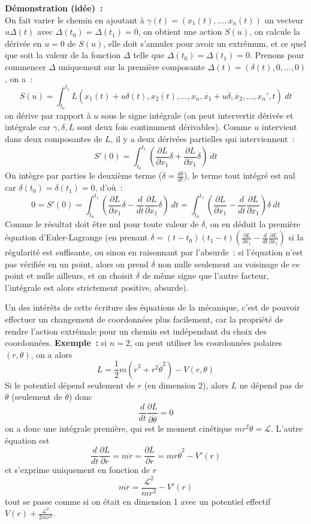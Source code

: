 \documentclass[a4paper,11pt]{article}
\begin{document}
\begin{giacjshere}
{\bf D\'emonstration (id\'ee)~:}\\
On fait varier le chemin en ajoutant \`a 
$\gamma(t)=(x_1(t),...,x_n(t))$
un vecteur $u \Delta(t)$ avec $\Delta(t_0)=\Delta(t_1)=0$, on obtient
une action $S(u)$, on calcule la d\'eriv\'ee en $u=0$
de $S(u)$, elle doit s'annuler pour avoir un extr\^emum, et
ce quel que soit la valeur de la fonction $\Delta$ 
telle que $\Delta(t_0)=\Delta(t_1)=0$. Prenons pour commencer $\Delta$
uniquement sur la premi\`ere composante
$\Delta(t)=(\delta(t),0,...,0)$, on a~:
$$ S(u) = \int_{t_0}^{t_1}
L(x_1(t)+u\delta(t),x_2(t),...,x_n,\dot{x_1}+u\dot{\delta},\dot{x_2},...,x_n',t)  \ dt$$
on d\'erive par rapport \`a $u$ sous le signe int\'egrale (on peut
intervertir d\'eriv\'ee et int\'egrale car $\gamma, \delta, L$ sont
deux fois continument d\'erivables). Comme $u$ intervient dans deux
composantes de $L$, il y a deux d\'eriv\'ees partielles qui
interviennent~:
$$ S'(0) =\int_{t_0}^{t_1} \left(\frac{\partial L}{\partial x_1} \delta + 
\frac{\partial L}{\partial \dot{x_1}} \dot{\delta} \right) \ dt$$
On int\`egre par parties le deuxi\`eme terme ($\dot{\delta}=\frac{d
  \delta}{dt}$), le terme tout int\'egr\'e est nul 
car $\delta(t_0)=\delta(t_1)=0$, d'o\`u~:
$$ 0=S'(0)=\int_{t_0}^{t_1} \left( \frac{\partial L}{\partial x_1} \delta 
-\frac{d}{dt} \frac{\partial L}{\partial \dot{x_1}} \delta \right) \ 
dt
=\int_{t_0}^{t_1} \left( \frac{\partial L}{\partial x_1} 
-\frac{d}{dt} \frac{\partial L}{\partial \dot{x_1}} \right) \delta \ 
dt$$
Comme le r\'esultat doit \^etre nul
pour toute valeur de $\delta$, on en d\'eduit la premi\`ere
\'equation d'Euler-Lagrange (en prenant
$\delta=(t-t_0)(t_1-t) (\frac{\partial L}{\partial x_1} 
-\frac{d}{dt} \frac{\partial L}{\partial \dot{x_1}})$ si la r\'egularit\'e
est suffisante, ou sinon en raisonnant par l'absurde~:
si l'\'equation n'est pas v\'erifi\'ee
en un point, alors on prend $\delta$ non nulle seulement
au voisinage de ce point et nulle ailleurs, et on choisit $\delta$
de m\^eme signe que l'autre facteur, l'int\'egrale est alors
strictement positive, absurde).

Un des int\'er\^ets de cette \'ecriture des \'equations de la
m\'ecanique, c'est de pouvoir effectuer un changement de coordonn\'ees
plus facilement, car la propri\'et\'e de rendre l'action extr\^emale pour un
chemin est ind\'ependant du choix des coordonn\'ees.
{\bf Exemple~:} si $n=2$, on peut utiliser les coordonn\'ees polaires 
$(r,\theta)$, on a alors
$$ L=\frac{1}{2}m(\dot{r}^2+r^2 \dot{\theta}^2) - V(r,\theta)$$
Si le potentiel d\'epend seulement de $r$ (en dimension 2), alors $L$ ne
d\'epend pas de $\theta$ (seulement de $\dot{\theta}$) donc
$$ \frac{d}{dt} \frac{\partial L}{\partial \dot{\theta}} = 0$$
on a donc une int\'egrale premi\`ere, qui est le moment cin\'etique
$mr^2 \dot{\theta}=\mathcal{L}$. L'autre \'equation est
$$ \frac{d}{dt} \frac{\partial L}{\partial \dot{r}} = m\ddot{r}
= \frac{\partial L}{\partial r} = m r \dot{\theta}^2 - V'(r)$$
et s'exprime uniquement en fonction de $r$
$$ m\ddot{r} = \frac{\mathcal{L}^2}{mr^3} - V'(r)$$
tout se passe comme si on \'etait en dimension 1 avec un potentiel
effectif $V(r)+ \frac{\mathcal{L}^2}{2mr^2}$.


\end{giacjshere}
\end{document}
